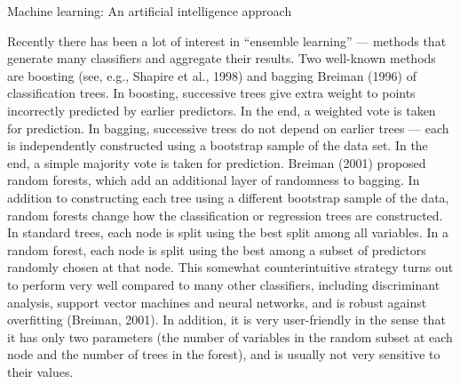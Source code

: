 Machine learning: An artificial intelligence approach\cite{michalski2013machine}

Recently there has been a lot of interest in “ensemble learning” — methods that generate many classifiers and aggregate their results. Two well-known methods are boosting (see, e.g., Shapire et al., 1998) and bagging Breiman (1996) of classification trees. In boosting, successive trees give extra weight to points incorrectly predicted by earlier predictors. In the end, a weighted vote is taken for prediction. In bagging, successive trees do not depend on earlier trees — each is independently constructed using a bootstrap sample of the data set. In the end, a simple majority vote is taken for prediction. Breiman (2001) proposed random forests, which add an additional layer of randomness to bagging. In addition to constructing each tree using a different bootstrap sample of the data, random forests change how the classification or regression trees are constructed. In standard trees, each node is split using the best split among all variables. In a random forest, each node is split using the best among a subset of predictors randomly chosen at that node. This somewhat counterintuitive strategy turns out to perform very well compared to many other classifiers, including discriminant analysis, support vector machines and neural networks, and is robust against overfitting (Breiman, 2001). In addition, it is very user-friendly in the sense that it has only two parameters (the number of variables in the random subset at each node and the number of trees in the forest), and is usually not very sensitive to their values. \cite{liaw2002classification}



